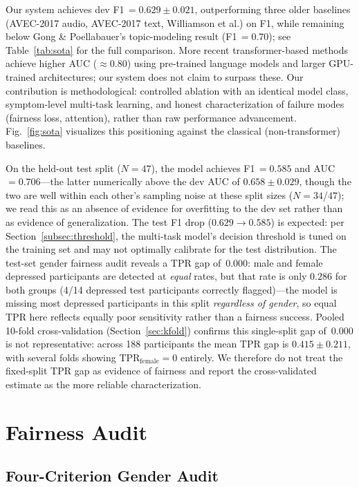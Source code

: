 \documentclass[5p,twocolumn]{elsarticle}
\begin{document}
Our system achieves dev F1\,$=0.629\pm0.021$, outperforming three older
baselines (AVEC-2017 audio, AVEC-2017 text, Williamson et al.) on F1,
while remaining below Gong \& Poellabauer's topic-modeling result
(F1\,$=0.70$); see Table~\ref{tab:sota} for the full comparison.
More recent transformer-based methods \cite{ray2019} achieve
higher AUC ($\approx$0.80) using pre-trained language models and larger
GPU-trained architectures; our system does not claim to surpass these.
Our contribution is methodological: controlled ablation with an
identical model class, symptom-level multi-task learning, and honest
characterization of failure modes (fairness loss, attention), rather
than raw performance advancement. Fig.~\ref{fig:sota} visualizes this
positioning against the classical (non-transformer) baselines.

On the held-out test split ($N{=}47$), the model achieves
F1\,$=0.585$ and AUC\,$=0.706$---the latter numerically
above the dev AUC of $0.658\pm0.029$, though the two are well within
each other's sampling noise at these split sizes ($N{=}34$/$47$); we
read this as an absence of evidence for overfitting to the dev set
rather than as evidence of generalization. The test F1 drop ($0.629\to0.585$) is
expected: per Section~\ref{subsec:threshold}, the multi-task model's
decision threshold is tuned on the training set and may not
optimally calibrate for the test distribution. The test-set gender
fairness audit reveals a TPR gap of~0.000: male and female depressed
participants are detected at \emph{equal} rates, but that rate is only
$0.286$ for both groups (4/14 depressed test participants correctly
flagged)---the model is missing most depressed participants in this
split \emph{regardless of gender}, so equal TPR here reflects equally
poor sensitivity rather than a fairness success. Pooled 10-fold
cross-validation (Section~\ref{sec:kfold}) confirms this single-split
gap of~0.000 is not representative: across 188 participants the mean
TPR gap is $0.415\pm0.211$, with several folds showing $\text{TPR}_\text{female}=0$
entirely. We therefore do not treat the fixed-split TPR gap as
evidence of fairness and report the cross-validated estimate as the
more reliable characterization.

\section{Fairness Audit}
\label{sec:fairness}

\subsection{Four-Criterion Gender Audit}
\end{document}
